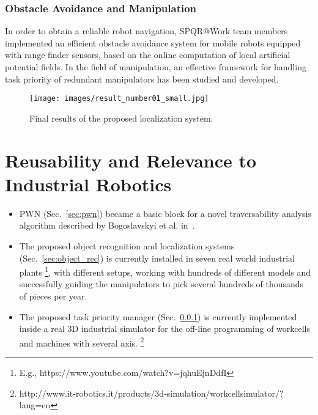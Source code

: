 \documentclass[conference]{IEEEtran}
\begin{document}
\subsubsection{Obstacle Avoidance and Manipulation}\label{sec:manipulation}
In order to obtain a reliable robot navigation, SPQR@Work team members implemented an efficient obstacle avoidance system for mobile robots equipped with range finder sensors, based on the online computation of local artificial potential fields. \newline In the field of manipulation, an effective framework for handling task priority of redundant manipulators has been studied and developed.
\begin{figure}[t!]
\begin{center}
\texttt{[image: images/result\_number01\_small.jpg]}
\end{center}
\caption{Final results of the proposed localization system.}\label{fig:obj_rec}
\end{figure}

\section{Reusability and Relevance to Industrial Robotics}

\begin{itemize}
 \item PWN (Sec.~\ref{sec:pwn}) became a basic block for a novel traversability analysis algorithm described by Bogoslavskyi et al. in~\cite{bogoslavskyi-ECMR-13}.
 \item The proposed object recognition and localization systems (Sec.~\ref{sec:object_rec}) is currently installed in seven real world industrial plants \footnote{E.g., https://www.youtube.com/watch?v=jqhuEjnDdfI}, with different setups, working with hundreds of different models and successfully guiding the manipulators to pick several hundreds of thousands of pieces per year. 
 \item The proposed task priority manager (Sec.~\ref{sec:manipulation}) is currently implemented inside a real 3D industrial simulator for the off-line programming of workcells and machines with several axis.  \footnote{http://www.it-robotics.it/products/3d-simulation/workcellsimulator/?lang=en}
\end{itemize}


 

\end{document}
